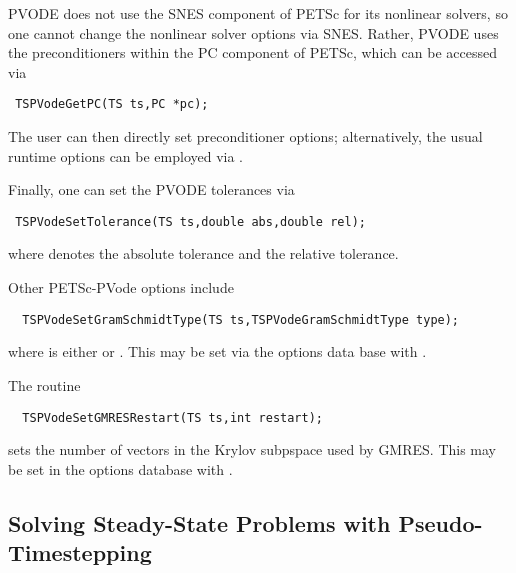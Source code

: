 PVODE does not use the SNES component of PETSc for its nonlinear
solvers, so one cannot change the nonlinear solver options via
SNES. Rather, PVODE uses the preconditioners within the PC component
of PETSc, which can be accessed via
\begin{verbatim}
 TSPVodeGetPC(TS ts,PC *pc);
\end{verbatim}
The user can then directly set preconditioner options; 
alternatively, the usual runtime options can be employed
via . 

Finally, one can set the PVODE tolerances via
\begin{verbatim}
 TSPVodeSetTolerance(TS ts,double abs,double rel);
\end{verbatim}
where  denotes the absolute tolerance and 
the relative tolerance. 

Other PETSc-PVode options include
\begin{verbatim}
  TSPVodeSetGramSchmidtType(TS ts,TSPVodeGramSchmidtType type);
\end{verbatim}
where  is either  or 
. 
 
 This may be set via the options data base
with .

The routine 
\begin{verbatim}
  TSPVodeSetGMRESRestart(TS ts,int restart);
\end{verbatim}
sets the number of vectors in the Krylov subpspace used by GMRES.
 This may be set in the options 
database with . 


\subsection{Solving Steady-State Problems with Pseudo-Timestepping}

